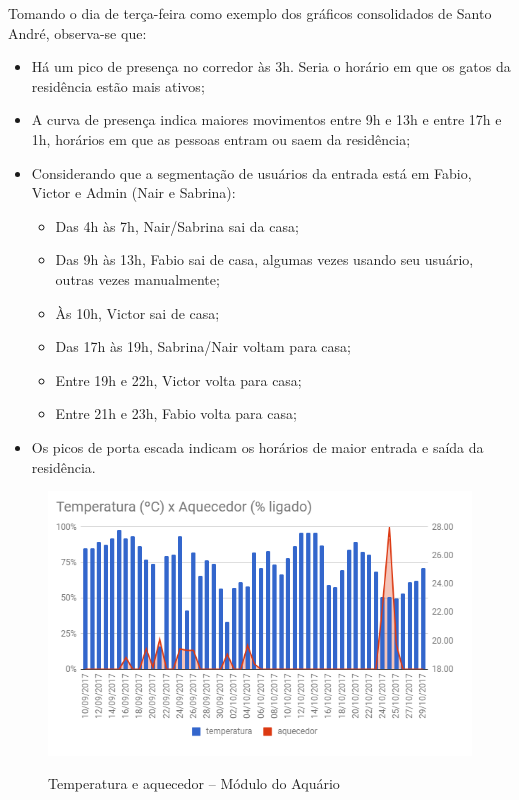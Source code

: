 Tomando o dia de terça-feira como exemplo dos gráficos consolidados de Santo André, observa-se que:

\begin{itemize}
	\item Há um pico de presença no corredor às 3h. Seria o horário em que os gatos da residência estão mais ativos;
	\item A curva de presença indica maiores movimentos entre 9h e 13h e entre 17h e 1h, horários em que as pessoas entram ou saem da residência;
	\item Considerando que a segmentação de usuários da entrada está em Fabio, Victor e Admin (Nair e Sabrina):
	\begin{itemize}
		\item Das 4h às 7h, Nair/Sabrina sai da casa;
		\item Das 9h às 13h, Fabio sai de casa, algumas vezes usando seu usuário, outras vezes manualmente;
		\item Às 10h, Victor sai de casa;
		\item Das 17h às 19h, Sabrina/Nair voltam para casa;
		\item Entre 19h e 22h, Victor volta para casa;
		\item Entre 21h e 23h, Fabio volta para casa;
	\end{itemize}
	\item Os picos de porta escada indicam os horários de maior entrada e saída da residência.
\end{itemize}

\begin{figure}[H]
	\centering
	\caption{Temperatura e aquecedor -- Módulo do Aquário}
	\includegraphics[width=1.0\textwidth]{TempAquecedorAqua}
	\label{fig:TempAquecedorAqua}
\end{figure}

